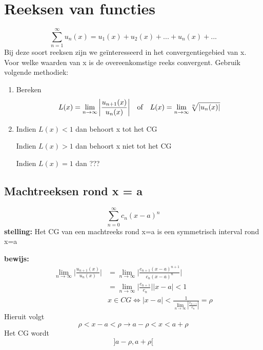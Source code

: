 \section{Reeksen van functies}
$$\sum_{n = 1}^{\infty} u_n(x) = u_1(x) + u_2(x) + ... + u_n(x) + ...$$
Bij deze soort reeksen zijn we geïnteresseerd in het convergentiegebied van x. Voor welke waarden van x is de overeenkomstige reeks convergent.
Gebruik volgende methodiek:
\begin{enumerate}
    \item Bereken
        $$L(x) = \lim\limits_{n\to\infty} \bigg| \frac{u_{n + 1}(x)}{u_n(x)} \bigg| \quad\hbox{of}\quad L(x) = \lim\limits_{n\to\infty} \sqrt[n]{|u_n(x)|}$$
    \item Indien $L(x) < 1$ dan behoort x tot het CG

          Indien $L(x) > 1$ dan behoort x niet tot het CG

          Indien $L(x) = 1$ dan ???

\end{enumerate}

\subsection{Machtreeksen rond x = a}
$$\sum_{n = 0}^{\infty} c_n(x - a)^n$$
\textbf{stelling:} Het CG van een machtreeks rond x=a is een symmetrisch interval rond x=a

\textbf{bewijs:}
\begin{equation*}
    \begin{split}
        \lim\limits_{n\to\infty} \bigg|\frac{ u_{n + 1}(x)}{u_n(x)} \bigg| & = \lim\limits_{n\to\infty} \bigg|\frac{ c_{n + 1}(x - a)^{n + 1}}{c_n(x - a)^n} \bigg| \\
        & = \lim\limits_{n\to\infty} \bigg | \frac{c_{n + 1}}{c_n} \bigg | |x - a| < 1 \\
        & x \in CG \Leftrightarrow |x - a| < \frac{1}{ \lim\limits_{n\to\infty} | \frac{c_{n + 1}}{c_n}|}  = \rho
    \end{split}
\end{equation*}
Hieruit volgt $$\rho < x - a < \rho \rightarrow a - \rho < x < a + \rho$$
Het CG wordt $$]a - \rho, a + \rho[$$

